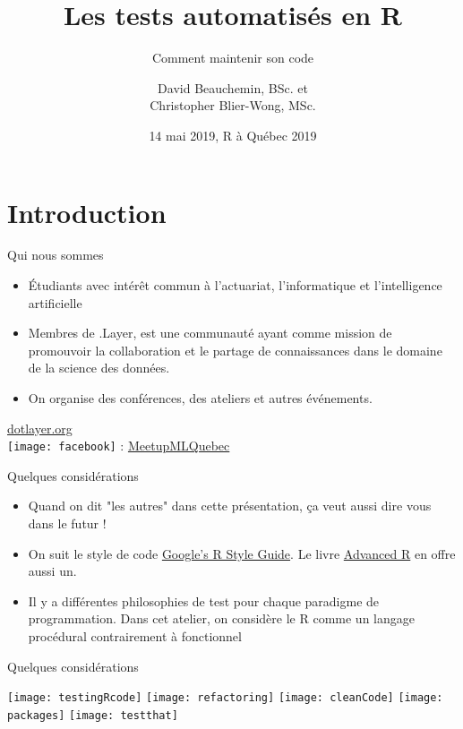 \documentclass[11pt]{beamer}
\title[Les tests automatisés en R]{Les tests automatisés en R}
\subtitle{Comment maintenir son code}
\author[D. Beauchemin \& C. Blier-Wong]{David Beauchemin, BSc. et \\ Christopher Blier-Wong, MSc.}
\institute[.Layer]
{
	.Layer, Université Laval, CRDM, GRAAL
}
\date{14 mai 2019, R à Québec 2019}
\begin{document}
\begin{frame}[label=titre, plain]
\titlepage
\end{frame}

\section{Introduction}

\begin{frame}{Qui nous sommes}
\begin{itemize}
	\item Étudiants avec intérêt commun à l'actuariat, l'informatique et l'intelligence artificielle
	\item Membres de .Layer, est une communauté ayant comme mission de promouvoir la collaboration et le partage de connaissances dans le domaine de la science des données.
	\item On organise des conférences, des ateliers et autres événements. 
\end{itemize}
\begin{center}
	\href{dotlayer.org}{dotlayer.org}\\
	\texttt{[image: facebook]} : \href{https://www.facebook.com/MeetupMLQuebec/}{MeetupMLQuebec}
\end{center}
\end{frame}

\begin{frame}{Quelques considérations}
\begin{itemize}
\item Quand on dit "les autres" dans cette présentation, ça veut aussi dire vous dans le futur !
\item On suit le style de code \href{https://google.github.io/styleguide/Rguide.xml\#functionlanguage}{Google's R Style Guide}. Le livre \href{http://adv-r.had.co.nz/Style.html}{Advanced R} en offre aussi un. 
\item Il y a différentes philosophies de test pour chaque paradigme de programmation. Dans cet atelier, on considère le \textsf{R} comme un langage procédural contrairement à fonctionnel
\end{itemize}
\end{frame}

\begin{frame}{Quelques considérations} %

\texttt{[image: testingRcode]} \hfill
\texttt{[image: refactoring]} \hfill
\texttt{[image: cleanCode]} \hfill
\texttt{[image: packages]} \hfill
\texttt{[image: testthat]} 

\end{frame}
\end{document}

